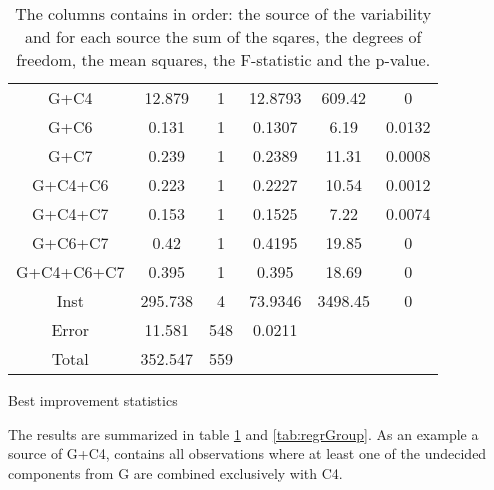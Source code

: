 \documentclass[../main.tex]{subfiles}
\begin{document}
\begin{table}
\begin{adjustbox}{width=\columnwidth,center}
\begin{subtable}{.85\columnwidth}
\begin{tabular}{cccccc}
            \hline
            G+C4        & 12.879    & 1 & 12.8793   & 609.42& 0     \\
            G+C6        & 0.131     & 1 & 0.1307    & 6.19  & 0.0132\\
            G+C7        & 0.239     & 1 & 0.2389    & 11.31 & 0.0008\\
            G+C4+C6     & 0.223     & 1 & 0.2227    & 10.54 & 0.0012\\
            G+C4+C7     & 0.153     & 1 & 0.1525    & 7.22  & 0.0074\\
            G+C6+C7     & 0.42      & 1 & 0.4195    & 19.85 & 0     \\
            G+C4+C6+C7  & 0.395     & 1 & 0.395     & 18.69 & 0     \\
            Inst        & 295.738   & 4 & 73.9346   &3498.45& 0     \\
            Error       & 11.581    &548& 0.0211    &       &       \\
            Total       & 352.547   &559&           &       &       \\
            \hline
            \end{tabular}
        \caption{Best improvement statistics}
            \label{tab:anovaBestGroup}
        \end{subtable}
    \end{adjustbox}
    \label{tab:anovaGroup}
    \caption*{The columns contains in order: the source of the variability and for each source the sum of the sqares, the degrees of freedom, the mean squares, the F-statistic and the p-value.}
\end{table}

The results are summarized in table \ref{tab:anovaGroup} and \cref{tab:regrGroup}. 
As an example a source of G+C4, contains all observations where at least one of the undecided components from G are combined exclusively with C4.
\end{document}
